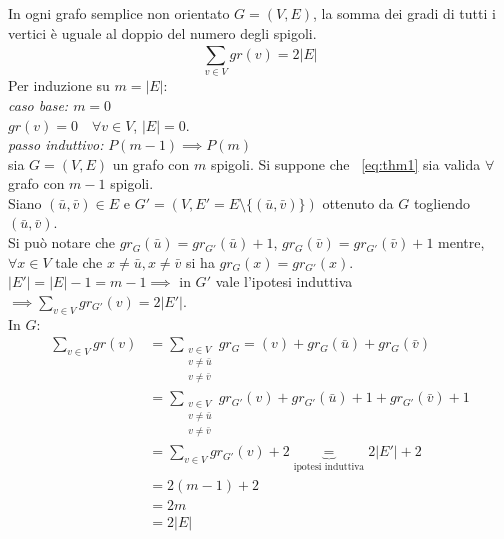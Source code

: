 \begin{thm}
In ogni grafo semplice non orientato $G=(V,E)$, la somma dei gradi di tutti i vertici è
uguale al doppio del numero degli spigoli.
\begin{equation} \label{eq:thm1} \sum_{v \in V}^{} gr(v) = 2|E| \end{equation}
\proof
	Per induzione su $m = |E|$:\\
	\emph{caso base: $m = 0$}\\	
	\indent $gr(v) = 0 \quad \forall v \in V$, \quad $|E| = 0$.\\
	\emph{passo induttivo:} $P(m-1) \implies P(m)$\\
	\indent sia $G=(V,E)$ un grafo con $m$ spigoli. Si suppone che ~\ref{eq:thm1} 
	sia valida $\forall$ grafo con $m-1$ spigoli.\\
	Siano $(\bar{u}, \bar{v}) \in E$ e $G'=(V, E'=E \setminus \{(\bar{u}, \bar{v})\})$ ottenuto da $G$ togliendo 
	$(\bar{u}, \bar{v})$.\\
	Si può notare che $gr_G(\bar{u})= gr_{G'}(\bar{u})+1$, $gr_G(\bar{v}) = gr_{G'}(\bar{v})+1$ mentre,
	$\forall x \in V$ tale che $x \neq \bar{u}, x \neq \bar{v}$ si ha $ gr_G(x) = gr_{G'}(x)$.\\%
	$|E'| = |E|-1 = m -1 \implies$ in $G'$ vale l'ipotesi induttiva 
    ${\implies \sum_{v \in V}^{} gr_{G'}(v) = 2|E'|}$.\\In $G$:
    \begin{equation*}%
    \begin{split}
	 \sum_{v \in V}^{} gr(v) & = 
     \sum_{\substack{v \in V \\ v \neq \bar{u} \\ v \neq \bar{v}} }^{} 
        gr_G=(v)+gr_G(\bar{u})+gr_G(\bar{v}) \\ & =
	 \sum_{\substack{v\in V \\ v\neq \bar{u} \\ v\neq \bar{v}} }^{} 
        gr_{G'}(v)+gr_{G'}(\bar{u})+1 +gr_{G'}(\bar{v}) +1 \\ & =
	 \sum_{v \in V}^{} gr_{G'}(v) + 2 \underbrace{=}_{\text{ipotesi induttiva}} 2|E'| + 2 \\
     & = 2(m-1) + 2 \\
	 & = 2m \\ & = 2|E|
    \end{split}
    \end{equation*}
\endproof
\end{thm}

